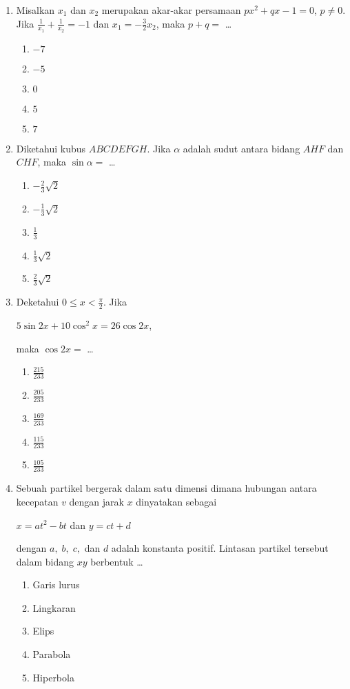 \documentclass[A4,12PT, english, twocolumn]{journal}
\begin{document}
\begin{enumerate}
\item Misalkan $x_1$ dan $x_2$ merupakan akar-akar persamaan $px^2+qx-1=0$, $p \neq 0$. Jika $\frac{1}{x_1}+\frac{1}{x_2}=-1$ dan $x_1=-\frac{3}{2}x_2$, maka $p+q=$ \dots
    \begin{enumerate}
        \item $-7$
        \item $-5$
        \item $0$
        \item $5$
        \item $7$
    \end{enumerate}

\item Diketahui kubus $ABCDEFGH$. Jika $\alpha$ adalah sudut antara bidang $AHF$ dan $CHF$, maka $\sin{\alpha}=$ \dots
    \begin{enumerate}
        \item $-\frac{2}{3}\sqrt{2}$
        \item $-\frac{1}{3}\sqrt{2}$
        \item $\frac{1}{3}$
        \item $\frac{1}{3}\sqrt{2}$
        \item $\frac{2}{3}\sqrt{2}$
    \end{enumerate}

\item Deketahui $0 \leq x < \frac{\pi}{2}$. Jika
\begin{center}
    $5 \sin{2x}+10 \cos^2{x}=26 \cos{2x}$,
\end{center}
maka $\cos{2x}=$ \dots
    \begin{enumerate}
        \item $\frac{215}{233}$
        \item $\frac{205}{233}$
        \item $\frac{169}{233}$
        \item $\frac{115}{233}$
        \item $\frac{105}{233}$
    \end{enumerate}
    
    
\newpage
\item Sebuah partikel bergerak dalam satu dimensi dimana hubungan antara kecepatan $v$ dengan jarak $x$ dinyatakan sebagai
\begin{center}
    $x=at^2-bt$ dan $y=ct+d$
\end{center}
dengan $a, \; b, \; c,$ dan $d$ adalah konstanta positif. Lintasan partikel tersebut dalam bidang $xy$ berbentuk \dots
    \begin{enumerate}
        \item Garis lurus
        \item Lingkaran
        \item Elips
        \item Parabola
        \item Hiperbola
    \end{enumerate}
  

\end{enumerate}
\end{document}
